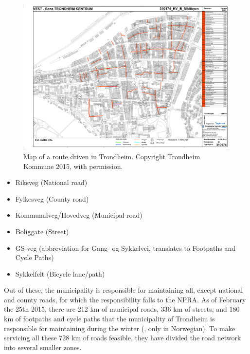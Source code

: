 \begin{landscape}
\begin{figure}[thbp]
    \centerline{\includegraphics[height=0.945\textwidth]{figures/Routes/PreExisting/310174.pdf}}
    \caption{Map of a route driven in Trondheim. Copyright Trondheim Kommune 2015, with permission.}
    \label{fig:map_KV_B_used}
\end{figure}
\end{landscape}

\begin{itemize}
    \item Riksveg (National road)
    \item Fylkesveg (County road)
    \item Kommunalveg/Hovedveg (Municipal road)
    \item Boliggate (Street)
    \item GS-veg (abbreviation for Gang- og Sykkelvei, translates to Footpaths and Cycle Paths) %
    \item Sykkelfelt (Bicycle lane/path)
\end{itemize}


Out of these, the municipality is responsible for maintaining all, except national and county roads, for which the responsibility falls to the NPRA. As of February the 25th 2015, there are 212 km of municipal roads, 336 km of streets, and 180 km of footpaths and cycle paths that the municipality of Trondheim is responsible for maintaining during the winter (\citep{trondheimKommuneVinterdriftNettside}, only in Norwegian). To make servicing all these 728 km of roads feasible, they have divided the road network into several smaller zones.

